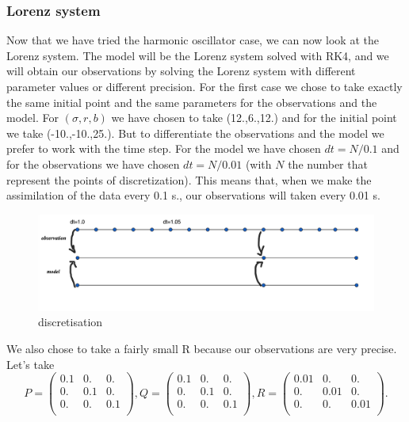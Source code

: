 \subsubsection{Lorenz system}
\noindent Now that we have tried the harmonic oscillator case, we can now look at the Lorenz system. The model will be the Lorenz system solved with RK4, and we will obtain our observations by solving the Lorenz system with different parameter values or different precision.
For the first case we chose to take exactly the same initial point and the same parameters for the observations and the model.
For $(\sigma, r, b)$ we have chosen to take (12.,6.,12.) and for the initial point we take (-10.,-10.,25.). But to differentiate the observations and the model we prefer to work with the time step. For the model we have chosen $dt=N/0.1$ and for the observations we have chosen $dt=N/0.01$ (with $N$ the number that represent the points of discretization). This means that, when we make the assimilation of the data  every 0.1 s., our observations will taken every 0.01 s.
\begin{figure}[H]
    \centering
		\includegraphics[width=1\textwidth]{"images/enkf/dt.png"}
		\caption{discretisation}
\end{figure}
We also chose to take a fairly small R because our observations are very precise.
\noindent\newline Let's take 
			$$P=\begin{pmatrix}
            0.1 & 0. & 0. \\
            0. & 0.1 & 0. \\
            0. & 0. & 0.1 \\
            \end{pmatrix} ,
            Q=\begin{pmatrix}
            0.1 & 0. & 0. \\
            0. & 0.1 & 0. \\
            0. & 0. & 0.1 \\
            \end{pmatrix},
            R=\begin{pmatrix}
            0.01 & 0. & 0. \\
            0. & 0.01 & 0. \\
            0. & 0. & 0.01 \\
            \end{pmatrix}.$$ 

